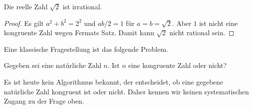 \begin{korollar}
  Die reelle Zahl $\sqrt{2}$ ist irrational. 
\end{korollar}
\begin{proof}
  Es gilt $a^2+b^2=2^2$ und $ab/2=1$ für $a=b=\sqrt 2$. Aber $1$ ist
  nicht eine kongruente Zahl wegen Fermats Satz. Damit kann $\sqrt 2$
  nicht rational sein.
\end{proof}

Eine klassische Fragestellung ist das folgende Problem.

\begin{problem}
  Gegeben sei eine natürliche Zahl $n$. Ist $n$ eine kongruente Zahl oder
  nicht? 
\end{problem}

Es ist heute kein Algorithmus bekannt, der entscheidet, ob eine
gegebene natürliche Zahl kongruent ist oder nicht. Daher kennen wir
keinen systematischen Zugang zu der Frage oben.


